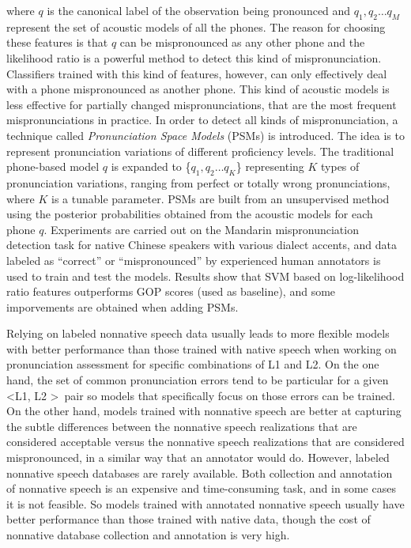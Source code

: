where $q$ is the canonical label of the observation being pronounced and {$q_{1}, q_{2} \dotsc q_{M}$}
represent the set of acoustic models of all the phones. The reason for choosing these features is
that $q$ can be mispronounced as any other phone and the likelihood ratio is a powerful
method to detect this kind of mispronunciation. Classifiers trained with this kind of features, however, 
can only effectively deal with a phone mispronounced as another phone. This kind of acoustic models is 
less effective for partially changed mispronunciations, that are the most frequent mispronunciations
in practice. In order to detect all kinds of mispronunciation, a technique called  
\textit{Pronunciation Space Models} (PSMs) is introduced. The idea is to represent pronunciation variations
of different proficiency levels. The traditional phone-based model $q$ is expanded to 
\{$q_{1}, q_{2} \dotsc q_{K}$\} representing $K$ types of pronunciation variations, ranging from perfect or
totally wrong pronunciations, where $K$ is a tunable parameter. PSMs are built from an unsupervised method
using the posterior probabilities obtained from the acoustic models for each phone $q$.
Experiments are carried out on the 
Mandarin mispronunciation detection task for native Chinese speakers with various dialect accents, 
and data labeled as ``correct'' or ``mispronounced'' by experienced human annotators is used to train and test the models.
Results show that SVM based on log-likelihood ratio features outperforms GOP scores (used as baseline), and some
imporvements are obtained when adding PSMs.

Relying on labeled nonnative speech data usually leads to more flexible models 
with better performance than those trained with native speech
when working on pronunciation assessment for specific combinations of L1 and L2. On the one hand,
the set of common pronunciation errors tend to be particular for a given \textless L1, L2 \textgreater \ pair so 
models that specifically focus on those errors can be trained. On the other hand, models trained
with nonnative speech are better at capturing the subtle differences between the nonnative
speech realizations that are considered acceptable versus the nonnative speech realizations
that are considered mispronounced, in a similar way that an annotator would do. 
However, labeled nonnative speech databases are rarely available. Both collection and annotation 
of nonnative speech is an expensive and time-consuming task, and in some cases it is not feasible.
So models trained with annotated nonnative speech usually have better performance
than those trained with native data, though the cost of nonnative database 
collection and annotation is very high.

